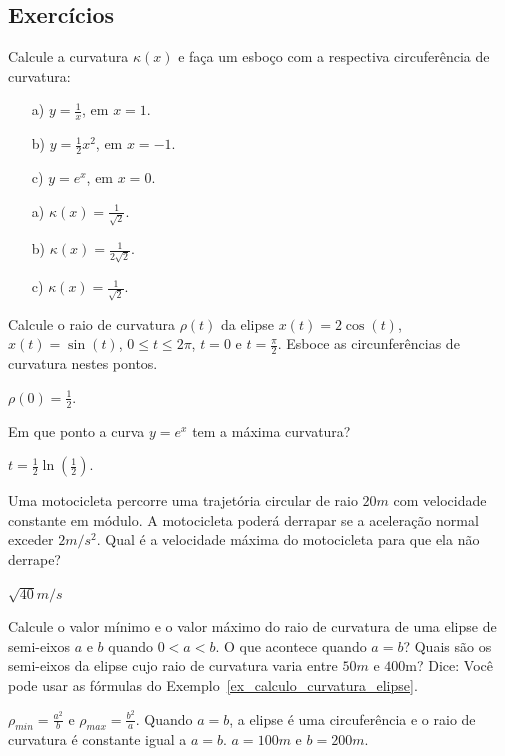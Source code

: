 \subsection*{Exercícios}
\begin{exer}
 Calcule a curvatura $\kappa(x)$ e faça um esboço com a respectiva circuferência de curvatura:
 \begin{itemize}
  \item[a)] $y=\frac{1}{x}$, em $x=1$. 
  \item[b)] $y=\frac{1}{2}x^2$, em $x=-1$.
  \item[c)] $y=e^x$, em $x=0$.
 \end{itemize}
 \end{exer}
\begin{resp}
 \begin{itemize}
  \item[a)] $\kappa(x) = \frac{1}{\sqrt{2}}$.
  \item[b)] $\kappa(x) = \frac{1}{2\sqrt{2}}$.
  \item[c)] $\kappa(x) = \frac{1}{\sqrt{2}}$.
 \end{itemize}
 
\end{resp}

\begin{exer}
  Calcule o raio de curvatura $\rho(t)$ da elipse $x(t)=2\cos(t)$, $x(t)=\sin(t)$, $0\leq t\leq2\pi$, $t=0$ e $t=\frac{\pi}{2}$. Esboce as circunferências de curvatura nestes pontos.
\end{exer}
\begin{resp}
  $\rho(0)=\frac{1}{2}$.
\end{resp}

\begin{exer}
Em que ponto a curva $y=e^x$ tem a máxima curvatura?
\end{exer}
\begin{resp}
 $t=\frac{1}{2}\ln\left(\frac{1}{2}\right)$.
\end{resp}

\begin{exer} Uma motocicleta percorre uma trajetória circular de raio $20m$ com velocidade constante em módulo. A motocicleta poderá derrapar se a aceleração normal exceder $2m/s^2$. Qual é a velocidade máxima do motocicleta para que ela não derrape?
\end{exer}
\begin{resp}
 $\sqrt{40}m/s$
\end{resp}

\begin{exer}
  Calcule o valor mínimo e o valor máximo do raio de curvatura de uma elipse de semi-eixos $a$ e $b$ quando $0<a<b$. O que acontece quando $a=b$? Quais são os semi-eixos da elipse cujo raio de curvatura varia entre $50m$ e $400$m? Dice: Você pode usar as fórmulas do Exemplo~\ref{ex_calculo_curvatura_elipse}.
 \end{exer}
 \begin{resp}
  $\rho_{min}= \frac{a^2}{b}$ e $\rho_{max}= \frac{b^2}{a}$. Quando $a=b$, a elipse é uma circuferência e o raio de curvatura é constante igual a $a=b$. $a=100m$ e $b=200m$. 
 \end{resp}
 

